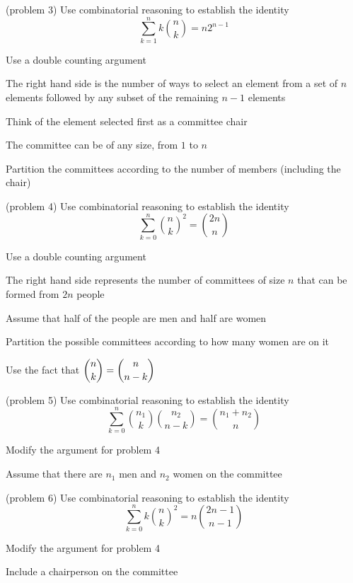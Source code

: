 \documentclass[handout]{ximera}
\begin{document}
\begin{problem}(problem 3)
Use combinatorial reasoning to establish the identity
\[
\sum_{k=1}^n k\binom{n}{k} = n2^{n-1}
\]
\begin{hint}
Use a double counting argument
\end{hint}
\begin{hint}
The right hand side is the number of ways to select an element from a set of $n$ elements 
followed by any subset of the remaining $n-1$ elements
\end{hint}
\begin{hint}
Think of the element selected first as a committee chair
\end{hint}
\begin{hint}
The committee can be of any size, from $1$ to $n$
\end{hint}
\begin{hint}
Partition the committees according to the number of members (including the chair)
\end{hint}
\end{problem}


\begin{problem}(problem 4)
Use combinatorial reasoning to establish the identity
\[
\sum_{k=0}^n \binom{n}{k}^2 = \binom{2n}{n}
\]
\begin{hint}
Use a double counting argument
\end{hint}
\begin{hint}
The right hand side represents the number of committees of size $n$ that can be formed from $2n$ people
\end{hint}
\begin{hint}
Assume that half of the people are men and half are women
\end{hint}
\begin{hint}
Partition the possible committees according to how many women are on it
\end{hint}
\begin{hint}
Use the fact that $\displaystyle \binom{n}{k} = \binom{n}{n-k}$
\end{hint}
\end{problem}

\begin{problem}(problem 5)
Use combinatorial reasoning to establish the identity
\[
\sum_{k=0}^n \binom{n_1}{k}\binom{n_2}{n-k} = \binom{n_1+n_2}{n}
\]
\begin{hint}
Modify the argument for problem 4
\end{hint}
\begin{hint}
Assume that there are $n_1$ men and $n_2$ women on the committee
\end{hint}
\end{problem}

\begin{problem}(problem 6)
Use combinatorial reasoning to establish the identity
\[
\sum_{k=0}^n k\binom{n}{k}^2 = n\binom{2n-1}{n-1}
\]
\begin{hint}
Modify the argument for problem 4
\end{hint}
\begin{hint}
Include a chairperson on the committee
\end{hint}
\end{problem}
\end{document}
